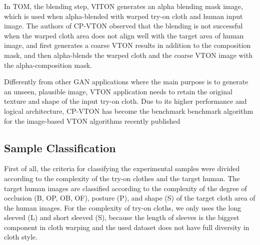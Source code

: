 In TOM, the blending step, VITON generates an alpha blending mask image, which is used when alpha-blended with warped try-on cloth and human input image. The authors of CP-VTON observed that the blending is not successful when the warped  cloth area does not align well with the target area of human image, and first generates a coarse VTON results in addition to the composition mask, and then alpha-blends the warped cloth and the coarse VTON image with the alpha-composition mask.       


Differently from other GAN applications where the main purpose is to generate an unseen, plausible image, VTON application needs to retain the original texture and shape of the input try-on cloth. Due to its higher performance and logical architecture, CP-VTON \cite{Wang2018TowardCI} has become the benchmark benchmark algorithm for the image-based VTON algorithms recently published 



 
\subsection{Sample Classification}

First of all, the criteria for classifying the experimental samples were divided according to the complexity of the try-on clothes and the target human. The target human images are classified according to the complexity of the degree of occlusion (B, OP, OB, OF), posture (P), and shape (S) of the target cloth area of the human images. For the complexity of try-on cloths, we only uses the long sleeved (L) and short sleeved (S), because the length of sleeves is the biggest component in cloth warping and the used dataset does not have full diversity in cloth  style.    


